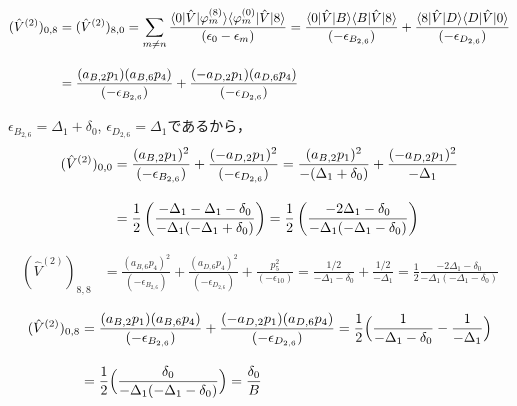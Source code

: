 \begin{align}
    (\hat{V}^{(2)})_{0,8}
    &=(\hat{V}^{(2)})_{8,0}
    =\sum_{m\neq n}
    \frac{\langle{0|\hat{V}|\varphi^{(8)}_m}\rangle
    \langle{\varphi^{(0)}_{m}|\hat{V}|8}\rangle}
    {(\epsilon_0-\epsilon_m)}
    =
    \frac{\langle{0|\hat{V}|B}\rangle
    \langle{B|\hat{V}|8}\rangle}
    {(-\epsilon_{B_{2,6}})}
    +\frac{\langle{8|\hat{V}|D}\rangle
    \langle{D|\hat{V}|0}\rangle}
    {(-\epsilon_{D_{2,6}})}\nn[10pt]
    & =
    \frac{(a_{B,2} p_1)(a_{B,6} p_4)}
    {(-\epsilon_{B_{2,6}})}
    +\frac{(-a_{D,2} p_1)(a_{D,6} p_4)}
    {(-\epsilon_{D_{2,6}})}
\end{align}





$\epsilon_{B_{2,6}} = \Delta_1 + \delta_0$, $\epsilon_{D_{2,6}}=\Delta_1$であるから，
\begin{align}
    (\hat{V}^{(2)})_{0,0}
    &=
    \frac{(a_{B,2} p_1)^2}
    {(-\epsilon_{B_{2,6}})}
    +\frac{(-a_{D,2} p_1)^2}
    {(-\epsilon_{D_{2,6}})}
    =
    \frac{(a_{B,2} p_1)^2}
    {-(\Delta_1 + \delta_0)}
    +\frac{(-a_{D,2} p_1)^2}
    {-\Delta_1}\nn[10pt]
    &
    =\frac{1}{2}
    \left(
    \frac{-\Delta_1-\Delta_1 - \delta_0}{-\Delta_1(-\Delta_1 + \delta_0)}
    \right)
    =\frac{1}{2}
    \left(\frac{-2\Delta_1 - \delta_0}{-\Delta_1(-\Delta_1 - \delta_0)}
    \right)
\end{align}


\begin{align}
    (\hat{V}^{(2)})_{8,8}
    &
    =\frac{(a_{B,6} p_4)^2}
    {(-\epsilon_{B_{2,6}})}
    +\frac{(a_{D,6} p_4)^2}
    {(-\epsilon_{D_{2,6}})}
    +\frac{p_5^2}
    {(-\epsilon_{10})}
    =\frac{1 / 2}
    {-\Delta_1 - \delta_0}
    +\frac{1 / 2}
    {-\Delta_1}
    =\frac{1}{2}\frac{-2\Delta_1 - \delta_0}{-\Delta_1(-\Delta_1 - \delta_0)}
\end{align}




\begin{align}
    (\hat{V}^{(2)})_{0,8}
    & =
    \frac{(a_{B,2} p_1)(a_{B,6} p_4)}
    {(-\epsilon_{B_{2,6}})}
    +\frac{(-a_{D,2} p_1)(a_{D,6} p_4)}
    {(-\epsilon_{D_{2,6}})}
    =\frac{1}{2}
    \Bigl(
    \frac{1}
    {-\Delta_1 - \delta_0}
    -\frac{1}
    {-\Delta_1}
    \Bigr)
    \nn[10pt]
    &=\frac{1}{2}
    \Bigl(
    \frac{\delta_0}
    {-\Delta_1(-\Delta_1 - \delta_0)}
    \Bigr)
    =\frac{\delta_0}{B}
\end{align}


